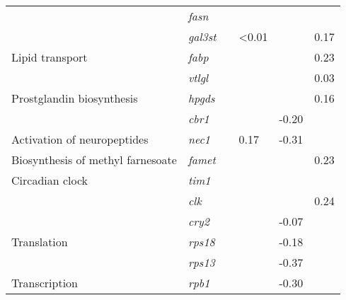 \begin{table}[]
\begin{tabular}{@{}llllll@{}}
                                      & \textit{fasn}   & \cellcolor[HTML]{C0C0C0}      &                & \cellcolor[HTML]{C0C0C0}      &          \\
                                      & \textit{gal3st} & \cellcolor[HTML]{C0C0C0}      & \textless 0.01 & \cellcolor[HTML]{C0C0C0}      & 0.17     \\
Lipid transport                       & \textit{fabp}   & \cellcolor[HTML]{C0C0C0}      &                & \cellcolor[HTML]{C0C0C0}      & 0.23     \\
                                      & \textit{vtlgl}  & \cellcolor[HTML]{C0C0C0}      &                & \cellcolor[HTML]{C0C0C0}      & 0.03     \\
Prostglandin biosynthesis             & \textit{hpgds}  & \cellcolor[HTML]{C0C0C0}      &                & \cellcolor[HTML]{C0C0C0}      & 0.16     \\
                                      & \textit{cbr1}   & \cellcolor[HTML]{C0C0C0}      &                & \cellcolor[HTML]{C0C0C0}-0.20 &          \\
Activation of neuropeptides           & \textit{nec1}   & \cellcolor[HTML]{C0C0C0}      & 0.17           & \cellcolor[HTML]{C0C0C0}-0.31 &          \\
Biosynthesis of methyl farnesoate     & \textit{famet}  & \cellcolor[HTML]{C0C0C0}      &                & \cellcolor[HTML]{C0C0C0}      & 0.23     \\
Circadian clock                       & \textit{tim1}   & \cellcolor[HTML]{C0C0C0}      &                & \cellcolor[HTML]{C0C0C0}      &          \\
                                      & \textit{clk}    & \cellcolor[HTML]{C0C0C0}      &                & \cellcolor[HTML]{C0C0C0}      & 0.24     \\
                                      & \textit{cry2}   & \cellcolor[HTML]{C0C0C0}      &                & \cellcolor[HTML]{C0C0C0}-0.07 &          \\
Translation                           & \textit{rps18}  & \cellcolor[HTML]{C0C0C0}      &                & \cellcolor[HTML]{C0C0C0}-0.18 &          \\
                                      & \textit{rps13}  & \cellcolor[HTML]{C0C0C0}      &                & \cellcolor[HTML]{C0C0C0}-0.37 &          \\
Transcription                         & \textit{rpb1}   & \cellcolor[HTML]{C0C0C0}      &                & \cellcolor[HTML]{C0C0C0}-0.30 &          \\

\end{tabular}
\end{table}
